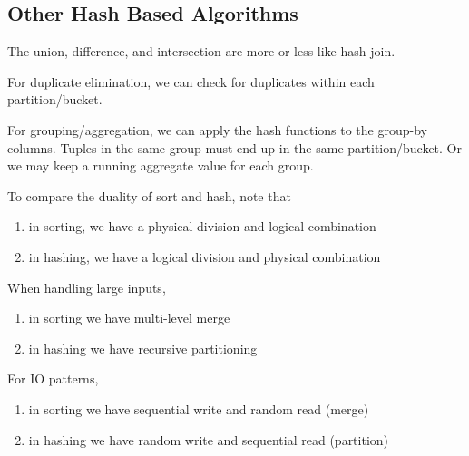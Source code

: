 \documentclass{article}
\begin{document}
  \subsection{Other Hash Based Algorithms}

    The union, difference, and intersection are more or less like hash join. 

    For duplicate elimination, we can check for duplicates within each partition/bucket. 

    For grouping/aggregation, we can apply the hash functions to the group-by columns. Tuples in the same group must end up in the same partition/bucket. Or we may keep a running aggregate value for each group. 

    To compare the duality of sort and hash, note that 
    \begin{enumerate}
      \item in sorting, we have a physical division and logical combination 
      \item in hashing, we have a logical division and physical combination
    \end{enumerate}
    When handling large inputs, 
    \begin{enumerate}
      \item in sorting we have multi-level merge 
      \item in hashing we have recursive partitioning 
    \end{enumerate}
    For IO patterns, 
    \begin{enumerate}
      \item in sorting we have sequential write and random read (merge) 
      \item in hashing we have random write and sequential read (partition) 
    \end{enumerate}
\end{document}
